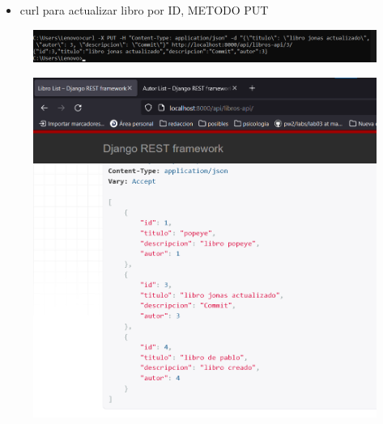 \documentclass{article}
\begin{document}
	\begin{itemize}
		\item curl para  actualizar libro por ID, METODO PUT
	\end{itemize}
	\begin{figure}[H]
		\centering
		\includegraphics[width=1\textwidth,keepaspectratio]{pruebas/curlActualizarLibro.png}
	\end{figure}
	\begin{figure}[H]
		\centering
		\includegraphics[width=1\textwidth,keepaspectratio]{pruebas/tarea-libro-actualizado.png}
	\end{figure}
	
\end{document}
